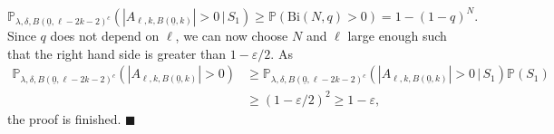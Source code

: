 \documentclass[11pt]{article}%
\newenvironment{proof}{\vspace{1ex}\noindent{\bf Proof.}}{\hspace*{\fill}$\blacksquare$\vspace{1ex}}
\newcommand{\eps}{\varepsilon}
\newcommand{\Pro}{\mathbb{P}}
\newcommand{\typ}{\underline{0}}
\begin{document}
\begin{proof}
\begin{equation*}
	\Pro_{\lambda,\delta,B(\typ,\ell-2k-2)^c}(|A_{\ell,k,B(\typ,k)}|> 0\,\vert\,S_1)\geq \Pro(\text{Bi}(N,q)> 0 )=1-(1-q)^N.
\end{equation*}
Since $ q $ does not depend on $ \ell $, we can now choose $ N $ and $ \ell $ large enough such that the right hand side is greater than $ 1-\eps/2 $. As 
\begin{equation*}
	\begin{split}
		\Pro_{\lambda,\delta,B(\typ,\ell-2k-2)^c}(|A_{\ell,k,B(\typ,k)}|> 0)&\geq \Pro_{\lambda,\delta,B(\typ,\ell-2k-2)^c}(|A_{\ell,k,B(\typ,k)}|> 0\,\vert\,S_1)\Pro(S_1)\\&\geq (1-\eps/2)^2\geq 1-\eps,
	\end{split}
\end{equation*}
the proof is finished.
\end{proof}
\end{document}
